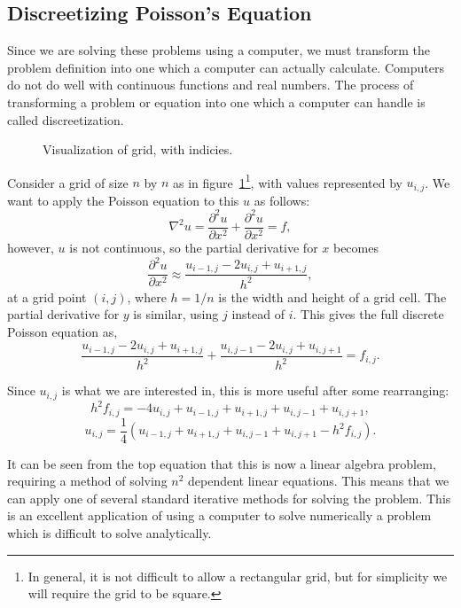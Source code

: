 \subsection{Discreetizing Poisson's Equation}

Since we are solving these problems using a computer, we must transform the problem definition into one which a computer
can actually calculate. Computers do not do well with continuous functions and real numbers. The process of transforming
a problem or equation into one which a computer can handle is called discreetization.

\begin{figure}[htb]
	\centering
	
	\caption{Visualization of grid, with indicies.}
\label{grid}
\end{figure}

Consider a grid of size $n$ by $n$ as in figure~\ref{grid}\footnote{In general, it is not difficult to allow a rectangular grid, but for simplicity
we will require the grid to be square.}, with values represented by $u_{i,j}$. We want to apply the Poisson equation to
this $u$ as follows:
$$\nabla^2 u = \frac{\partial^2 u}{\partial x^2} + \frac{\partial^2 u}{\partial x^2} = f,$$
however, $u$ is not continuous, so the partial derivative for $x$ becomes
$$\frac{\partial^2 u}{\partial x^2} \approx \frac{u_{i-1,j} - 2 u_{i,j} + u_{i+1,j}}{h^2},$$
at a grid point $(i,j)$, where $h = 1 / n$ is the width and height of a grid cell. The partial derivative for $y$ is similar, using $j$ instead of $i$.
This gives the full discrete Poisson equation as\cite{poisson-relax}\cite{myths},
$$\frac{u_{i-1,j} - 2 u_{i,j} + u_{i+1,j}}{h^2} + \frac{u_{i,j-1} - 2 u_{i,j} + u_{i,j+1}}{h^2} = f_{i,j}.$$

Since $u_{i,j}$ is what we are interested in, this is more useful after some rearranging:
$$h^2f_{i,j} = -4u_{i,j} + u_{i-1,j} + u_{i+1,j} + u_{i,j-1} + u_{i,j+1},$$
\begin{equation} \label{eq:poisson}
u_{i,j} = \frac{1}{4}(u_{i-1,j} + u_{i+1,j} + u_{i,j-1} + u_{i,j+1} - h^2f_{i,j}).
\end{equation}

It can be seen from the top equation that this is now a linear algebra problem, requiring a method of solving
$n^2$ dependent linear equations. This means that we can apply one of several standard iterative methods
for solving the problem. This is an excellent application of using a computer to solve numerically a problem
	which is difficult to solve analytically.


